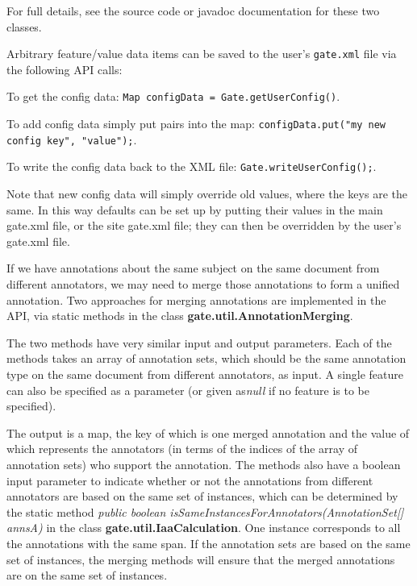 For full details, see the source code or javadoc documentation for these two
classes.


Arbitrary feature/value data items can be saved to the user's {\tt gate.xml}
file via the following API calls:

To get the config data: {\tt Map configData = Gate.getUserConfig()}.

To add config data simply put pairs into the map: {\tt configData.put("my new
config key", "value");}.

To write the config data back to the XML file: {\tt Gate.writeUserConfig();}.

Note that new config data will simply override old values, where the keys are
the same. In this way defaults can be set up by putting their values in the
main gate.xml file, or the site gate.xml file; they can then be overridden by
the user's gate.xml file.




If we have annotations about the same subject on the same document from
different annotators, we may need to merge those annotations to form a unified
annotation. Two approaches for merging annotations are implemented in the API,
via static methods in the class {\bf gate.util.AnnotationMerging}.

The two methods have very similar input and output parameters.  Each of the
methods takes an array of annotation sets, which should be the same annotation
type on the same document from different annotators, as input. A single
feature can also be specified as a parameter (or given as{\em null} if no
feature is to be specified).

The output is a map, the key of which is one merged annotation and the value
of which represents the annotators (in terms of the indices of the array of
annotation sets) who support the annotation. The methods also have a boolean
input parameter to indicate whether or not the annotations from different
annotators are based on the same set of instances, which can be determined by
the static method {\em public boolean
  isSameInstancesForAnnotators(AnnotationSet[] annsA)} in the class {\bf
  gate.util.IaaCalculation}. One instance corresponds to all the annotations
with the same span.  If the annotation sets are based on the same set of
instances, the merging methods will ensure that the merged annotations are on
the same set of instances.

